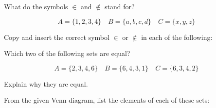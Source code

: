 \documentclass[12pt, a4paper, addpoints]{exam}
\begin{document}
\begin{questions}
\newpage

\question What do the symbols $\in$ and $\notin$ stand for?

\[
A = \{1, 2, 3, 4\} \quad B = \{a, b, c, d\} \quad C = \{x, y, z\}
\]

Copy and insert the correct symbol $\in$ or $\notin$ in each of the following:
\begin{multicols}{5}
\end{multicols}


\question Which two of the following sets are equal?

\[
A = \{2, 3, 4, 6\} \quad B = \{6, 4, 3, 1\} \quad C = \{6, 3, 4, 2\}
\]

Explain why they are equal.




\question From the given Venn diagram, list the elements of each of these sets:

\begin{minipage}{0.5\textwidth}
\end{minipage}
\end{questions}
\end{document}
